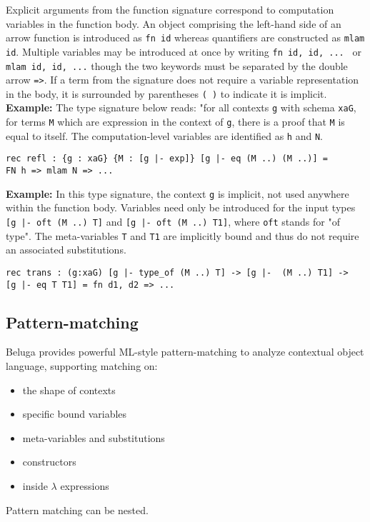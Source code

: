 \documentclass[11pt]{article}
\begin{document}
Explicit arguments from the function signature correspond to computation variables in the function body. An object comprising the left-hand side of an arrow function is introduced as \texttt{fn id} whereas quantifiers are constructed as \texttt{mlam id}. Multiple variables may be introduced at once by writing \texttt{fn id, id, ... } or \texttt{mlam id, id, ...} though the two keywords must be separated by the double arrow \texttt{=>}. If a term from the signature does not require a variable representation in the body, it is surrounded by parentheses \texttt{( )} to indicate it is implicit. \\

\textbf{Example:} The type signature below reads: "for all contexts \texttt{g} with schema \texttt{xaG}, for terms \texttt{M} which are expression in the context of \texttt{g}, there is a proof that \texttt{M} is equal to itself. The computation-level variables are identified as \texttt{h} and \texttt{N}.
\begin{verbatim}
rec refl : {g : xaG} {M : [g |- exp]} [g |- eq (M ..) (M ..)] =
FN h => mlam N => ...
\end{verbatim}

\textbf{Example:} In this type signature, the context \texttt{g} is implicit, not used anywhere within the function body. Variables need only be introduced for the input types \texttt{[g |- oft (M ..) T]} and \texttt{[g |- oft (M ..) T1]}, where \texttt{oft} stands for "of type". The meta-variables \texttt{T} and \texttt{T1} are implicitly bound and thus do not require an associated substitutions. 
\begin{verbatim}
rec trans : (g:xaG) [g |- type_of (M ..) T] -> [g |-  (M ..) T1] -> 
[g |- eq T T1] = fn d1, d2 => ...
\end{verbatim}


\subsection{Pattern-matching}
Beluga provides powerful ML-style pattern-matching to analyze contextual object language, supporting matching on:
\begin{itemize}
\item the shape of contexts
\item specific bound variables
\item meta-variables and substitutions
\item constructors
\item inside $\lambda$ expressions
\end{itemize}
Pattern matching can be nested.
\end{document}
